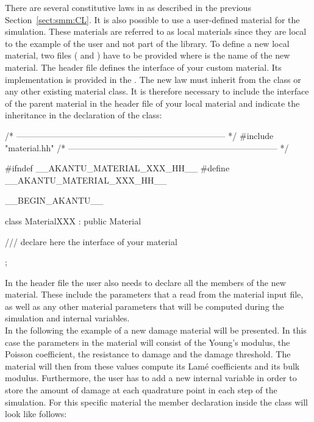 There are several constitutive laws in \akantu as described in the
previous Section~\ref{sect:smm:CL}. It is also possible to use a
user-defined material for the simulation. These materials are referred
to as local materials since they are local to the example of the user
and not part of the \akantu library.  To define a new local material,
two files ( and ) have
to be provided where  is the name of the new material. The
header file  defines the interface of your
custom material. Its implementation is provided in the
. The new law must inherit from the
 class or any other existing material class. It is
therefore necessary to include the interface of the parent material
in the header file of your local material and indicate the inheritance
in the declaration of the class:
\begin{cpp}
/* -------------------------------------------------------------------------- */
#include "material.hh"
/* -------------------------------------------------------------------------- */

#ifndef __AKANTU_MATERIAL_XXX_HH__
#define __AKANTU_MATERIAL_XXX_HH__

__BEGIN_AKANTU__

class MaterialXXX : public Material {

/// declare here the interface of your material

};
\end{cpp}  
In the header file the user also needs to declare all the members of
the new material. These include the parameters that a read from the
material input file, as well as any other material parameters that will be computed during the simulation and internal variables.\\ 
In the following the example of a new damage material will be presented. In this case the parameters in the material will consist of the Young's modulus, the Poisson coefficient, the resistance to damage and the damage threshold. The material will then from these values compute its Lam\'{e} coefficients and its bulk modulus. Furthermore, the user has to add a new internal variable  in order to store the amount of damage at each quadrature point in each step of the simulation. For this specific material the member declaration inside the class will look like follows:
